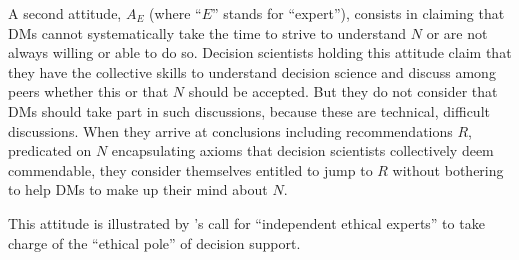 \documentclass[preprint, french, english, 11pt, authoryear]{elsarticle}%
\newcommand{\ac}[1]{#1}
\newcommand{\acp}[1]{#1s}
\begin{document}
A second attitude, $A_E$ (where ``$E$'' stands for “expert”), consists in claiming that \acp{DM} cannot systematically take the time to strive to understand $N$ or are not always willing or able to do so. 
Decision scientists holding this attitude claim that they have the collective skills to understand decision science and discuss among peers whether this or that $N$ should be accepted. 
But they do not consider that \acp{DM} should take part in such discussions, because these are technical, difficult discussions. 
When they arrive at conclusions including recommendations $R$, predicated on $N$ encapsulating axioms that decision scientists collectively deem commendable, they consider themselves entitled to jump to $R$ without bothering to help \acp{DM} to make up their mind about $N$. 
\begin{changebar}
This attitude is illustrated by \citet{brans_ethics_2002}'s call for ``independent ethical experts'' to take charge of the ``ethical pole'' of decision support.%
\end{changebar}

\end{document}
